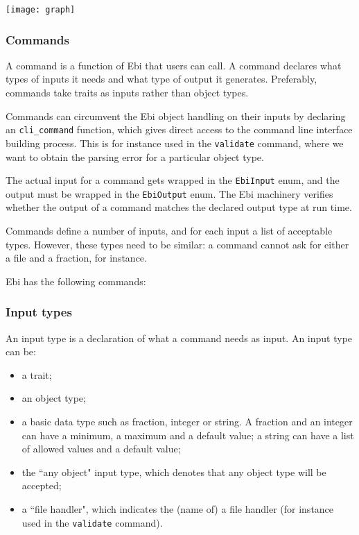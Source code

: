 \documentclass{article}
\def\ebiCommand#1{\texttt{#1}}
\begin{document}
        
        	\texttt{[image: graph]}
        \restoregeometry
    
        \subsubsection{Commands}
            A command is a function of Ebi that users can call.
            A command declares what types of inputs it needs and what type of output it generates. 
            Preferably, commands take traits as inputs rather than object types.
    
            Commands can circumvent the Ebi object handling on their inputs by declaring an \texttt{cli\_command} function, which gives direct access to the command line interface building process.
            This is for instance used in the \ebiCommand{validate} command, where we want to obtain the parsing error for a particular object type.
    
            The actual input for a command gets wrapped in the \texttt{EbiInput} enum, and the output must be wrapped in the \texttt{EbiOutput} enum.
            The Ebi machinery verifies whether the output of a command matches the declared output type at run time.
            
            Commands define a number of inputs, and for each input a list of acceptable types.
            However, these types need to be similar: a command cannot ask for either a file and a fraction, for instance.
    
            Ebi has the following commands:
            \ebicommandlist
    
        \subsubsection{Input types}
            An input type is a declaration of what a command needs as input.
            An input type can be:
            \begin{itemize}
                \item a trait;
                \item an object type;
                \item a basic data type such as fraction, integer or string. A fraction and an integer can have a minimum, a maximum and a default value; a string can have a list of allowed values and a default value;
                \item the ``any object" input type, which denotes that any object type will be accepted;
                \item a ``file handler", which indicates the (name of) a file handler (for instance used in the \ebiCommand{validate} command).
            \end{itemize}
    
\end{document}
